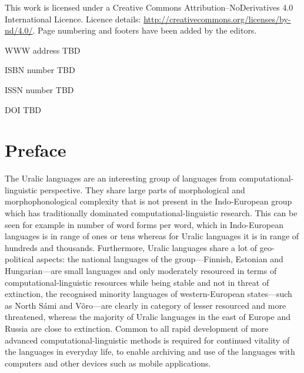 \documentclass[b5paper]{book}
\begin{document}
\frontmatter

\cleardoublepage
\thispagestyle{empty}
{\centering{}}

This work is licensed under a Creative Commons Attribution–NoDerivatives
4.0 International Licence.  Licence details:
\url{http://creativecommons.org/licenses/by-nd/4.0/}. Page numbering and
footers have been added by the editors.

WWW address TBD

ISBN number TBD

ISSN number TBD

DOI TBD

\clearpage

\pagestyle{fancy}

\chapter*{Preface}

The Uralic languages are an interesting group of languages from
computational-linguistic perspective. They share large parts of morphological
and morphophonological complexity that is not present in the Indo-European
group which has traditionally dominated computational-linguistic research. This
can be seen for example in number of word forms per word, which in
Indo-European languages is in range of ones or tens whereas for Uralic
languages it is in range of hundreds and thousands. Furthermore, Uralic
languages share a lot of geo-political aspects: the national languages of the
group---Finnish, Estonian and Hungarian---are small languages and only
moderately resourced in terms of computational-linguistic resources while being
stable and not in threat of extinction, the recognised minority languages of
western-European states---such as North Sámi and Võro---are clearly in category
of lesser resourced and more threatened, whereas the majority of Uralic
languages in the east of Europe and Russia are close to extinction. Common to
all rapid development of more advanced computational-linguistic methods is
required for continued vitality of the languages in everyday life, to enable
archiving and use of the languages with computers and other devices such as
mobile applications.
\end{document}
